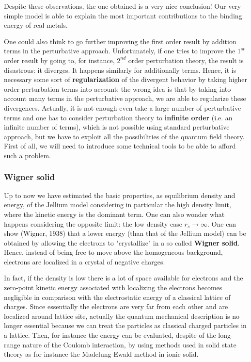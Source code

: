 \documentclass[../main/main.tex]{subfiles}
\begin{document}
Despite these observations, the one obtained is a very nice conclusion! Our very simple model is able to explain the most important contributions to the binding energy of real metals.

One could also think to go further improving the first order result by addition terms in the perturbative approach.
Unfortunately, if one tries to improve the \( 1^{st} \) order result by going to, for instance, \( 2^{nd} \) order perturbation theory, the result is disastrous: it diverges. It happens similarly for additionally terms. Hence, it is necessary some sort of \textbf{regularization} of the divergent behavior by taking higher order perturbation terms into account; the wrong idea is that  by taking into account many terms in the perturbative approach, we are able to regularize these divergences. Actually, it is not enough even take a large number of perturbative terms and one has to consider perturbation theory to \textbf{infinite order} (i.e. an infinite number of terms), which is not possible using standard perturbative approach, but we have to exploit all the possibilities of the quantum field theory. First of all, we will need to introduce some technical tools to be able to afford such a problem.

\subsubsection{Wigner solid}

Up to now we have estimated the basic properties, as equilibrium density and energy, of the Jellium model considering in particular the high density limit, where the kinetic energy is the dominant term.
One can also wonder what happens considering the opposite limit: the low density case \( r_s \rightarrow \infty  \).  One can show (Wigner, 1938) that a lower energy (than that of the Jellium model) can be obtained by allowing the electrons to "crystallize" in a so called \textbf{Wigner solid}. Hence, instead of being free to move above the homogeneous background, electrons are  localized in a crystal of negative charges.

In fact, if the density is low there is a lot of space available for electrons and the zero-point kinetic energy associated with localizing the electrons becomes negligible in comparison with the electrostatic energy of a classical lattice of charges. Since essentially the electrons are very far from each other and are localized around lattice site, actually the quantum mechanical description is no longer essential because we can treat the particles as classical charged particles in a lattice.
Then, for instance the energy can be evaluated, despite of the long-range nature of the Coulomb interaction, by using methods used in solid state theory as for instance the Madelung-Ewald method in ionic solid.
\end{document}
